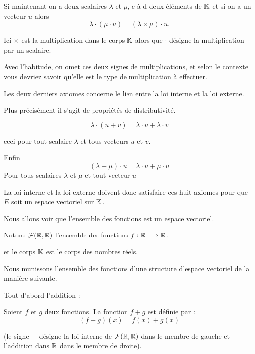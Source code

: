 \change

Si maintenant on a deux scalaires $\lambda$ et $\mu$, c-à-d deux éléments  de $\mathbb{K}$ 
et si on a un vecteur $u$ alors 
 $$ \lambda \cdot (\mu \cdot u) = (\lambda \times \mu )\cdot u.$$
 
Ici $\times$ est la multiplication dans le corps $\mathbb{K}$ alors que $\cdot$ désigne la multiplication par un scalaire.

Avec l'habitude, on omet ces deux signes de multiplications, et selon le contexte vous devriez savoir
qu'elle est le type de multiplication à effectuer.

\change

Les deux derniers axiomes concerne le lien entre la loi interne et la loi externe.


\change

Plus précisément il s'agit de propriétés de distributivité.




 $$\lambda \cdot (u+v) =\lambda \cdot u + \lambda \cdot v$$
 
ceci pour tout scalaire $\lambda$ et tous vecteurs $u$ et $v$.

\change


Enfin  
$$(\lambda + \mu ) \cdot u=\lambda \cdot u + \mu \cdot u$$
Pour tous scalaires $\lambda$ et $\mu$ et tout vecteur $u$



 La loi interne et la loi externe doivent donc satisfaire ces huit axiomes pour que $E$ 
 soit un espace vectoriel sur $\mathbb{K}$.



\diapo

Nous allons voir que l'ensemble des fonctions est un espace vectoriel.

Notons $\mathcal{F}(\mathbb{R}, \mathbb{R})$ l'ensemble des fonctions $f : \mathbb{R} \longrightarrow \mathbb{R}$.

et le corps $\mathbb{K}$ est le corps des nombres réels.

Nous munissons l'ensemble des fonctions d'une structure d'espace vectoriel de la manière  suivante. 

\change

Tout d'abord l'addition :

Soient $f$ et $g$ deux fonctions. La fonction $f+g$ est définie par  :
$$(f+g)(x)=f(x)+g(x)$$


(le signe $+$ désigne la loi interne de $\mathcal{F}(\mathbb{R} , \mathbb{R})$ dans le membre de gauche 
et l'addition dans $\mathbb{R}$ dans le membre de droite). 
 
